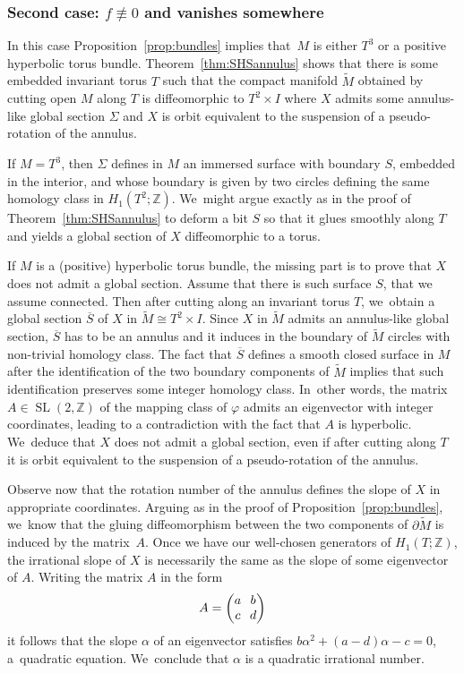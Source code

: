 \documentclass[JEP,XML,SOM,Unicode,NoEqCountersInSection,NoFloatCountersInSection,published]{cedram}
\DeclareMathOperator{\SL}{SL}
\theoremstyle{definition}
\begin{document}
\subsubsection*{Second case: $f\not \equiv 0$ and vanishes somewhere}
In this case Proposition~\ref{prop:bundles} implies that~$M$ is either $T^3$ or a positive hyperbolic torus bundle. Theorem~\ref{thm:SHSannulus} shows that there is some embedded invariant torus $T$ such that the compact manifold $\widetilde M$ obtained by cutting open $M$ along $T$ is diffeomorphic to $T^2\times I$ where $X$ admits some annulus-like global section $\Sigma$ and $X$ is orbit equivalent to the suspension of a pseudo-rotation of the annulus.

If $M=T^3$, then $\Sigma$ defines in $M$ an immersed surface with boundary $S$, embedded in the interior, and whose boundary is given by two circles defining the same homology class in $H_1(T^2;\mathbb{Z})$. We~might argue exactly as in the proof of Theorem~\ref{thm:SHSannulus} to deform a bit $S$ so that it glues smoothly along $T$ and yields a global section of $X$ diffeomorphic to a torus.

If $M$ is a (positive) hyperbolic torus bundle, the missing part is to prove that $X$ does not admit a global section. Assume that there is such surface $S$, that we assume connected. Then after cutting along an invariant torus $T$, we~obtain a global section $\overline S$ of $X$ in $\widetilde M \cong T^2\times I$. Since $X$ in $\widetilde{M}$ admits an annulus-like global section, $\overline{S}$ has to be an annulus and it induces in the boundary of $\widetilde M$ circles with non-trivial homology class.
The fact that $\overline S$ defines a smooth closed surface in $M$ after the identification of the two boundary components of $\widetilde M$ implies that such identification preserves some integer homology class. In~other words, the matrix $A\in \SL(2,\mathbb{Z})$ of the mapping class of $\varphi$ admits an eigenvector with integer coordinates, leading to a contradiction with the fact that $A$ is hyperbolic. We~deduce that $X$ does not admit a global section, even if after cutting along $T$ it is orbit equivalent to the suspension of a pseudo-rotation of the annulus.

Observe now that the rotation number of the annulus defines the slope of $X$ in appropriate coordinates. Arguing as in the proof of Proposition~\ref{prop:bundles}, we~know that the gluing diffeomorphism between the two components of $\partial \widetilde M$ is induced by the matrix~$A$. Once we have our well-chosen generators of $H_1(T;\mathbb{Z})$, the irrational slope of $X$ is necessarily the same as the slope of some eigenvector of $A$. Writing the matrix $A$ in the form
\begin{equation*}\arraycolsep3.5pt
A=\begin{pmatrix}
a & b \\
c & d
\end{pmatrix}
\end{equation*}
it follows that the slope $\alpha$ of an eigenvector satisfies $b\alpha^2+(a-d)\alpha-c=0$, a~quadratic equation. We~conclude that $\alpha$ is a quadratic irrational number.
\end{document}
